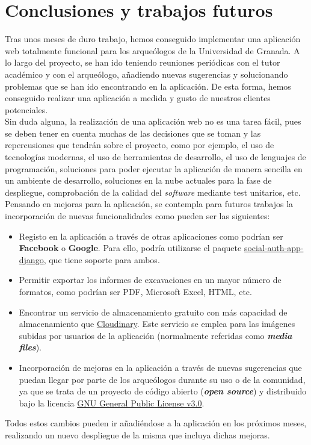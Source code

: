 \chapter{Conclusiones y trabajos futuros}
Tras unos meses de duro trabajo, hemos conseguido implementar una aplicación web totalmente
funcional para los arqueólogos de la Universidad de Granada. A lo largo del proyecto, se han
ido teniendo reuniones periódicas con el tutor académico y con el arqueólogo, añadiendo
nuevas sugerencias y solucionando problemas que se han ido encontrando en la aplicación. De
esta forma, hemos conseguido realizar una aplicación a medida y gusto de nuestros clientes
potenciales. \\

Sin duda alguna, la realización de una aplicación web no es una tarea fácil, pues se deben
tener en cuenta muchas de las decisiones que se toman y las repercusiones que tendrán sobre
el proyecto, como por ejemplo, el uso de tecnologías modernas, el uso de herramientas de
desarrollo, el uso de lenguajes de programación, soluciones para poder ejecutar la aplicación
de manera sencilla en un ambiente de desarrollo, soluciones en la nube actuales para la
fase de despliegue, comprobación de la calidad del \textit{software} mediante test unitarios,
etc. \\

Pensando en mejoras para la aplicación, se contempla para futuros trabajos la
incorporación de nuevas funcionalidades como pueden ser las siguientes:

    \begin{itemize}
        \item Registo en la aplicación a través de otras aplicaciones como podrían ser
        \textbf{Facebook} o \textbf{Google}. Para ello, podría utilizarse el paquete
        \href{https://python-social-auth.readthedocs.io/en/latest/configuration/django.html}
        {social-auth-app-django}, que tiene soporte para ambos.

        \item Permitir exportar los informes de excavaciones en un mayor número de formatos,
        como podrían ser PDF, Microsoft Excel, HTML, etc.

        \item Encontrar un servicio de almacenamiento gratuito con más capacidad de
        almacenamiento que \href{https://cloudinary.com/}{Cloudinary}. Este servicio se
        emplea para las imágenes subidas por usuarios de la aplicación (normalmente
        referidas como \textbf{\textit{media files}}).

        \newpage \item Incorporación de mejoras en la aplicación a través de nuevas sugerencias
        que puedan llegar por parte de los arqueólogos durante su uso o de la comunidad, ya
        que se trata de un proyecto de código abierto (\textbf{\textit{open source}}) y
        distribuido bajo la licencia \href{https://www.gnu.org/licenses/gpl-3.0.html}{GNU
        General Public License v3.0}.
    \end{itemize}

Todos estos cambios pueden ir añadiéndose a la aplicación en los próximos meses, realizando
un nuevo despliegue de la misma que incluya dichas mejoras.
